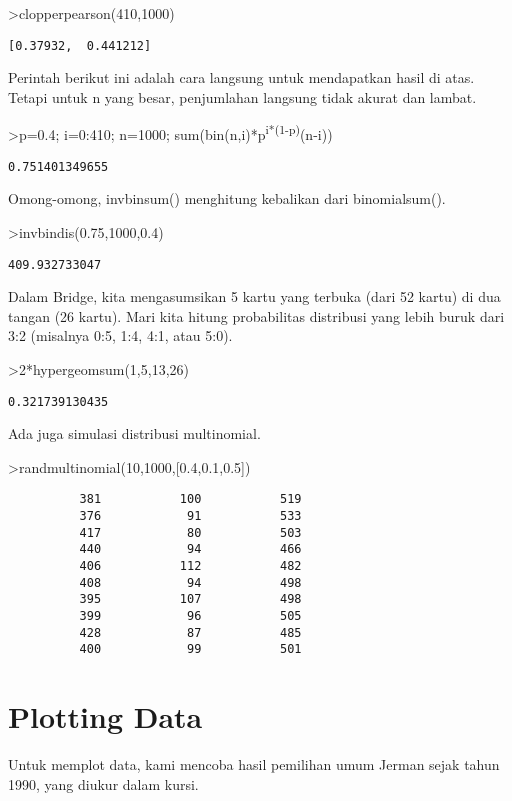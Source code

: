 \documentclass[
]{book}
\begin{document}
\textgreater clopperpearson(410,1000)

\begin{verbatim}
[0.37932,  0.441212]
\end{verbatim}

Perintah berikut ini adalah cara langsung untuk mendapatkan hasil di atas. Tetapi untuk n yang besar, penjumlahan langsung tidak akurat dan lambat.

\textgreater p=0.4; i=0:410; n=1000; sum(bin(n,i)*p\textsuperscript{i*(1-p)}(n-i))

\begin{verbatim}
0.751401349655
\end{verbatim}

Omong-omong, invbinsum() menghitung kebalikan dari binomialsum().

\textgreater invbindis(0.75,1000,0.4)

\begin{verbatim}
409.932733047
\end{verbatim}

Dalam Bridge, kita mengasumsikan 5 kartu yang terbuka (dari 52 kartu) di dua tangan (26 kartu). Mari kita hitung probabilitas distribusi yang lebih buruk dari 3:2 (misalnya 0:5, 1:4, 4:1, atau 5:0).

\textgreater2*hypergeomsum(1,5,13,26)

\begin{verbatim}
0.321739130435
\end{verbatim}

Ada juga simulasi distribusi multinomial.

\textgreater randmultinomial(10,1000,{[}0.4,0.1,0.5{]})

\begin{verbatim}
          381           100           519 
          376            91           533 
          417            80           503 
          440            94           466 
          406           112           482 
          408            94           498 
          395           107           498 
          399            96           505 
          428            87           485 
          400            99           501 
\end{verbatim}

\section{Plotting Data}\label{plotting-data}

Untuk memplot data, kami mencoba hasil pemilihan umum Jerman sejak tahun 1990, yang diukur dalam kursi.
\end{document}
